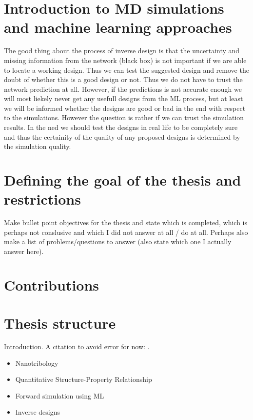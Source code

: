 \section{Introduction to MD simulations and machine learning approaches}


The good thing about the process of inverse design is that the uncertainty and missing information from the network (black box) is not important if we are able to locate a working design. Thus we can test the suggested design and remove the doubt of whether this is a good design or not. Thus we do not have to trust the network prediction at all. However, if the predictions is not accurate enough we will most liekely never get any usefull designs from the ML process, but at least we will be informed whether the designs are good or bad in the end with respect to the simulations. However the question is rather if we can trust the simulation results. In the ned we should test the designs in real life to be completely sure and thus the certainity of the quality of any proposed designs is determined by the simulation quality. 


\section{Defining the goal of the thesis and restrictions}
Make bullet point objectives for the thesis and state which is completed, which is perhaps not conslusive and which I did not answer at all / do at all. Perhaps also make a list of problems/questions to answer (also state which one I actually answer here).


\section{Contributions}

\section{Thesis structure }

\newpage
Introduction. A citation to avoid error for now: \cite{li_evolving_2016}.

\begin{itemize}
    \item Nanotribology
    \item Quantitative Structure-Property Relationship
    \item Forward simulation using ML
    \item Inverse designs
\end{itemize}



